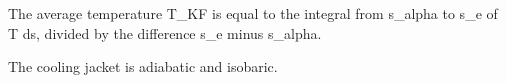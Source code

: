 The average temperature T_KF is equal to the integral from s_alpha to s_e of T ds, divided by the difference s_e minus s_alpha.

The cooling jacket is adiabatic and isobaric.